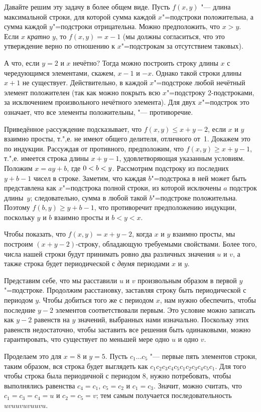 \documentclass[twoside]{book}
\begin{document}
Давайте решим эту задачу в более общем виде.
Пусть $f(x,y)$ "--- длина максимальной строки, для которой сумма каждой $x$"=подстроки положительна, а сумма каждой $y$"=подстроки отрицательна.
Можно предположить, что $x>y$.
Если $x$ \emph{кратно} $y$, то $f(x,y)=x-1$ (мы должны согласиться, что это утверждение верно по отношению к $x$"=подстрокам за отсутствием таковых).

А что, если $y=2$ и $x$ нечётно?
Тогда можно построить строку длины $x$ с чередующимся элементами, скажем, $x-1$ и $-x$.
Однако такой строки длины $x+1$ не существует.
Действительно, в каждой $x$"=подстроке любой нечётный элемент положителен 
(так как можно покрыть всю $x$"=подстроку 2-подстроками, за исключением произвольного нечётного элемента).
Для двух $x$"=подстрок это означает, что все элементы положительны, "---
противоречие.

Приведённое pассуждение подсказывает, что $f(x,y)\le x+y-2$, если $x$ и $y$ взаимно просты, 
т.",е. не имеют общего делителя, отличного от~1.
Докажем это по индукции.
Рассуждая от противного, предположим, что $f(x,y)\ge x+y-1$,
т.",е. имеется строка длины $x+y-1$, удовлетворяющая указанным условиям.
Положим $x=ay+b$, где $0\z<b\z<y$.
Рассмотрим подстроку из последних $y+b-1$ чисел в строке.
Заметим, что каждая $b$"=подстрока в ней 
может быть представлена как $x$"=подстрока полной строки, 
из которой исключены $a$ подстрок длины~$y$; 
следовательно, сумма в любой такой $b$"=подстроке положительна.
Поэтому
$f(b,y)\ge y+b-1$,
что противоречит предположению индукции, поскольку $y$ и $b$ взаимно просты и $b<y<x$. %

Чтобы показать, что $f(x,y)=x+y-2$, когда $x$ и $y$ взаимно просты, мы построим $(x+y-2)$-строку, обладающую требуемыми свойствами.
Более того, числа нашей строки будут принимать ровно два различных значения $u$ и $v$,
а также строка будет периодической с \emph{двумя} периодами $x$ и $y$.

Представим себе, что мы расставили $u$ и $v$ произвольным образом в первой $y$"=подстроке.
Продолжим расстановку, заставляя строку быть периодической с периодом $y$.
Чтобы добиться того же с периодом $x$,
нам нужно обеспечить, чтобы последние $y-2$ элементов соответствовали первым.
Это условие можно записать как $y-2$ равенств на $y$ значений, выбранных нами изначально.
Поскольку этих равенств недостаточно, чтобы заставить все решения быть одинаковыми, можно гарантировать, что существует по меньшей мере одно $u$ и одно $v$.

Проделаем это для $x=8$ и $y=5$.
Пусть $c_1\dots c_5$ "--- первые пять элементов строки, 
таким образом, вся строка будет выглядеть как
$c_1c_2c_3c_4c_5c_1c_2c_3c_4c_5c_1$.
Для того чтобы строка была периодичной с периодом 8, 
нужно потребовать, чтобы выполнялись равенства $c_4=c_1$, $c_5=c_2$ и $c_1=c_3$.
Значит, можно считать, что $c_1=c_3=c_4=u$ и $c_2=c_5=v$; 
тем самым получается последовательность $uvuuvuvuuvu$.
\end{document}
